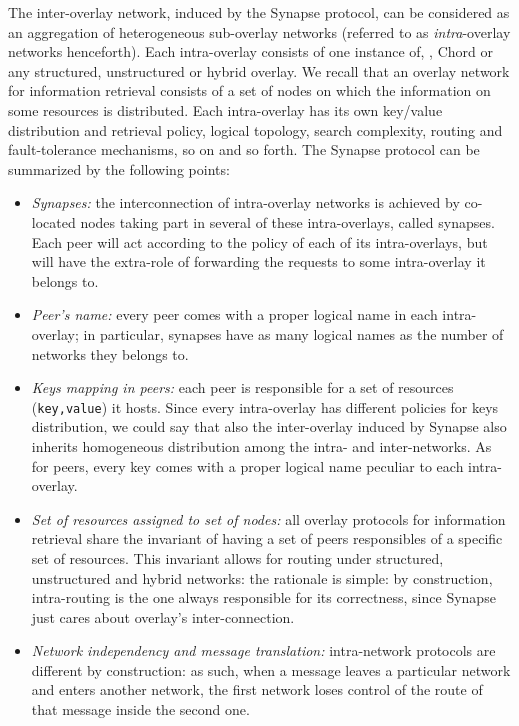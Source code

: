 The inter-overlay network, induced by the Synapse protocol, can be
considered as an aggregation of heterogeneous sub-overlay networks
(referred to as \emph{intra}-overlay networks henceforth).  Each
intra-overlay consists of one instance of, \eg, Chord or any
structured, unstructured or hybrid overlay. We recall that an overlay
network for information retrieval consists of a set of nodes on which
the information on some resources is distributed. Each intra-overlay
has its own key/value distribution and retrieval policy, logical
topology, search complexity, routing and fault-tolerance mechanisms,
so on and so forth. The Synapse protocol can be summarized by the
following points:
%
\begin{itemize}

\item {\em Synapses:} the interconnection of intra-overlay networks is
  achieved by co-located nodes taking part in several of these
  intra-overlays, called synapses. Each peer will act according to the
  policy of each of its intra-overlays, but will have the extra-role
  of forwarding the requests to some intra-overlay it belongs to.

\item {\em Peer's name:} every peer comes with a proper logical name
  in each intra-overlay; in particular, synapses have as many logical
  names as the number of networks they belongs to.

\item {\em Keys mapping in peers:} each peer is responsible for a set
  of resources ({\tt key,value}) it hosts. Since every intra-overlay
  has different policies for keys distribution, we could say that
  also the inter-overlay induced by Synapse also inherits homogeneous
  distribution among the intra- and inter-networks. As for peers,
  every key comes with a proper logical name peculiar to each
  intra-overlay.

\item {\em Set of resources assigned to set of nodes:} all overlay
  protocols for information retrieval share the invariant of having a
  set of peers responsibles of a specific set of resources. This
  invariant allows for routing under structured, unstructured and hybrid
  networks: the rationale is simple: by construction, 
  intra-routing is the one always responsible for its correctness, since Synapse just
  cares about overlay's inter-connection.

\item {\em Network independency and message translation:}
  intra-network protocols are different by construction: as such, when
  a message leaves a particular network and enters another network,
  the first network loses control of the route of that message inside the
  second one.


\end{itemize}
